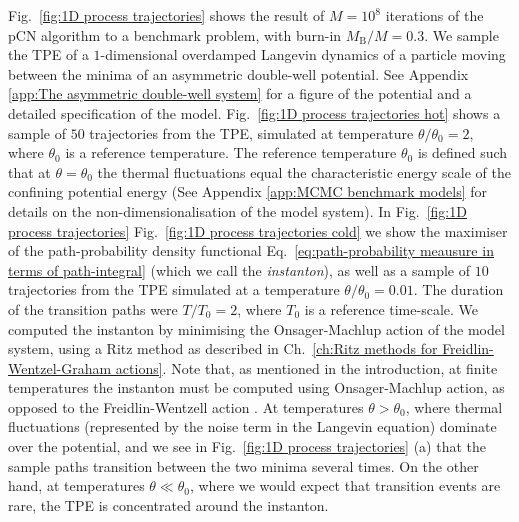 Fig.~\ref{fig:1D process trajectories} shows the result of $M=10^8$ iterations of the pCN algorithm to a benchmark problem, with burn-in $M_\text{B}/M = 0.3$. We sample the TPE of a $1$-dimensional overdamped Langevin dynamics of a particle moving between the minima of an asymmetric double-well potential. See Appendix \ref{app:The asymmetric double-well system} for a figure of the potential and a detailed specification of the model. Fig.~\ref{fig:1D process trajectories hot} shows a sample of $50$ trajectories from the TPE, simulated at temperature $\theta/\theta_0 = 2$, where $\theta_0$ is a reference temperature. The reference temperature $\theta_0$ is defined such that at $\theta = \theta_0$ the thermal fluctuations equal the characteristic energy scale of the confining potential energy (See Appendix \ref{app:MCMC benchmark models} for details on the non-dimensionalisation of the model system). In Fig.~\ref{fig:1D process trajectories} Fig.~\ref{fig:1D process trajectories cold} we show the maximiser of the path-probability density functional Eq.~\ref{eq:path-probability meausure in terms of path-integral} (which we call the \textit{instanton}), as well as a sample of $10$ trajectories from the TPE simulated at a temperature $\theta/\theta_0 = 0.01$. The duration of the transition paths were $T /T_0 = 2$, where $T_0$ is a reference time-scale. We computed the instanton by minimising the Onsager-Machlup action of the model system, using a Ritz method as described in Ch.~\ref{ch:Ritz methods for Freidlin-Wentzel-Graham actions}. Note that, as mentioned in the introduction, at finite temperatures the instanton must be computed using Onsager-Machlup action, as opposed to the Freidlin-Wentzell action \citep{gladrowExperimentalMeasurementRelative2021a, adibStochasticActionsDiffusive2008a}. At temperatures $\theta > \theta_0$, where thermal fluctuations (represented by the noise term in the Langevin equation) dominate over the potential, and we see in Fig.~\ref{fig:1D process trajectories} (a) that the sample paths transition between the two minima several times. On the other hand, at temperatures $\theta \ll \theta_0$, where we would expect that transition events are rare, the TPE is concentrated around the instanton.


